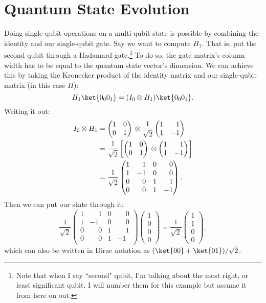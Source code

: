 \section{Quantum State Evolution}
Doing single-qubit operations on a multi-qubit state is possible by combining the identity and our single-qubit gate. Say we want to compute $H_1$. That is, put the second qubit through a Hadamard gate.\footnote{Note that when I say ``second" qubit, I'm talking about the most right, or least significant qubit. I will number them for this example but assume it from here on out.} To do so, the gate matrix's column width has to be equal to the quantum state vector's dimension. We can achieve this by taking the Kronecker product of the identity matrix and our single-qubit matrix (in this case $H$):
\begin{equation}
  H_1\ket{0_0 0_1} = (I_0 \otimes H_1)\ket{0_0 0_1}.
\end{equation}
Writing it out:
\begin{align}
  I_0 \otimes H_1 &=
  \igate{} \otimes \hgate{} \\
  &=
  \dfrac{1}{\sqrt2}
  \left[
    \igate{}
    \otimes
    \begin{pmatrix}
      1 & \phantom{-}1 \\
      1 & -1
    \end{pmatrix}
  \right] \\
&= \dfrac{1}{\sqrt2}
  \begin{pmatrix}
    1 & \phantom{-}1 & 0 & \phantom{-}0 \\
    1 & -1 & 0 & \phantom{-}0 \\
    0 & \phantom{-}0 & 1 & \phantom{-}1 \\
    0 & \phantom{-}0 & 1 & -1 \\
  \end{pmatrix}.
\end{align}
Then we can put our  state through it:
\begin{equation}
  \dfrac{1}{\sqrt2}
  \begin{pmatrix}
    1 & \phantom{-}1 & 0 & \phantom{-}0 \\
    1 & -1 & 0 & \phantom{-}0 \\
    0 & \phantom{-}0 & 1 & \phantom{-}1 \\
    0 & \phantom{-}0 & 1 & -1 \\
  \end{pmatrix}
  \begin{pmatrix}
    1 \\
    0 \\
    0 \\
    0
  \end{pmatrix}
  =
  \dfrac{1}{\sqrt2}
  \begin{pmatrix}
    1 \\
    1 \\
    0 \\
    0
  \end{pmatrix},
\end{equation}
which can also be written in Dirac notation as $(\ket{00} + \ket{01})/\sqrt2$.

